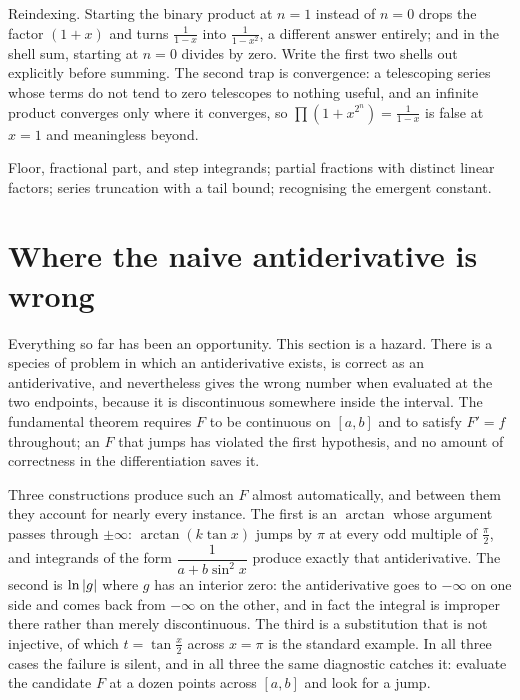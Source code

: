 \begin{trap}
Reindexing. Starting the binary product at $n=1$ instead of $n=0$ drops the factor $(1+x)$ and turns $\tfrac{1}{1-x}$ into $\tfrac{1}{1-x^{2}}$, a different answer entirely; and in the shell sum, starting at $n=0$ divides by zero. Write the first two shells out explicitly before summing. The second trap is convergence: a telescoping series whose terms do not tend to zero telescopes to nothing useful, and an infinite product converges only where it converges, so $\prod(1+x^{2^{n}})=\tfrac{1}{1-x}$ is false at $x=1$ and meaningless beyond.
\end{trap}

\begin{seealsob}Floor, fractional part, and step integrands; partial fractions with distinct linear factors; series truncation with a tail bound; recognising the emergent constant.\end{seealsob}

\section{Where the naive antiderivative is wrong}

Everything so far has been an opportunity. This section is a hazard. There is a species of problem in which an antiderivative exists, is correct as an antiderivative, and nevertheless gives the wrong number when evaluated at the two endpoints, because it is discontinuous somewhere inside the interval. The fundamental theorem requires $F$ to be continuous on $[a,b]$ and to satisfy $F'=f$ throughout; an $F$ that jumps has violated the first hypothesis, and no amount of correctness in the differentiation saves it.

Three constructions produce such an $F$ almost automatically, and between them they account for nearly every instance. The first is an $\arctan$ whose argument passes through $\pm\infty$: $\arctan(k\tan x)$ jumps by $\pi$ at every odd multiple of $\tfrac{\pi}{2}$, and integrands of the form $\dfrac{1}{a+b\sin^{2}x}$ produce exactly that antiderivative. The second is $\ln\left\lvert g\right\rvert$ where $g$ has an interior zero: the antiderivative goes to $-\infty$ on one side and comes back from $-\infty$ on the other, and in fact the integral is improper there rather than merely discontinuous. The third is a substitution that is not injective, of which $t=\tan\tfrac x2$ across $x=\pi$ is the standard example. In all three cases the failure is silent, and in all three the same diagnostic catches it: evaluate the candidate $F$ at a dozen points across $[a,b]$ and look for a jump.

